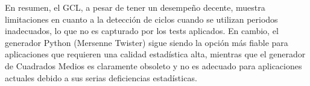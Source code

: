\documentclass{article}
\begin{document}
En resumen, el GCL, a pesar de tener un desempeño decente, muestra limitaciones en cuanto a la detección de ciclos cuando se utilizan periodos inadecuados, lo que no es capturado por los tests aplicados. En cambio, el generador Python (Mersenne Twister) sigue siendo la opción más fiable para aplicaciones que requieren una calidad estadística alta, mientras que el generador de Cuadrados Medios es claramente obsoleto y no es adecuado para aplicaciones actuales debido a sus serias deficiencias estadísticas.
\end{document}
